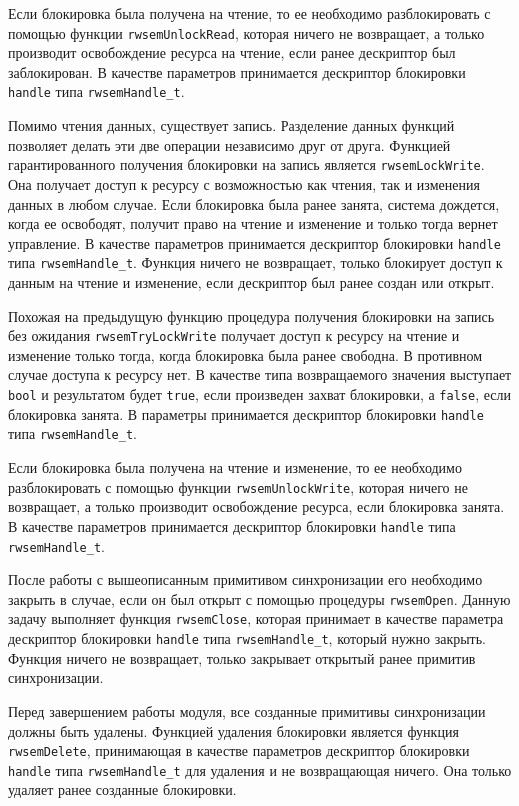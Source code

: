 Если блокировка была получена на чтение, то ее необходимо разблокировать с помощью функции \lstinline{rwsemUnlockRead}, которая ничего не возвращает, а только производит освобождение ресурса на чтение, если ранее дескриптор был заблокирован. В качестве параметров принимается дескриптор блокировки \lstinline{handle} типа \lstinline{rwsemHandle_t}.

Помимо чтения данных, существует запись. Разделение данных функций позволяет делать эти две операции независимо друг от друга. Функцией гарантированного получения блокировки на запись
является \lstinline{rwsemLockWrite}. Она получает доступ к ресурсу с возможностью как чтения, так и изменения данных в любом случае. Если блокировка была ранее занята, система дождется, когда ее освободят, получит право на чтение и изменение и только тогда вернет управление. В качестве параметров принимается дескриптор блокировки \lstinline{handle} типа \lstinline{rwsemHandle_t}. Функция ничего не возвращает, только блокирует доступ к данным на чтение и изменение, если дескриптор был ранее создан или открыт.

Похожая на предыдущую функцию процедура получения блокировки на запись без ожидания \lstinline{rwsemTryLockWrite} получает доступ к ресурсу на чтение и изменение только тогда, когда блокировка была ранее свободна. В противном случае доступа к ресурсу нет. В качестве типа возвращаемого значения выступает \lstinline{bool} и результатом будет \lstinline{true}, если произведен захват блокировки, а \lstinline{false}, если блокировка занята. В параметры принимается дескриптор блокировки \lstinline{handle} типа \lstinline{rwsemHandle_t}.

Если блокировка была получена на чтение и изменение, то ее необходимо разблокировать с помощью функции \lstinline{rwsemUnlockWrite}, которая ничего не возвращает, а только производит освобождение ресурса, если блокировка занята. В качестве параметров принимается дескриптор блокировки \lstinline{handle} типа \lstinline{rwsemHandle_t}.

После работы с вышеописанным примитивом синхронизации его необходимо закрыть в случае, если он был открыт с помощью процедуры \lstinline{rwsemOpen}. Данную задачу выполняет функция \lstinline{rwsemClose}, которая принимает в качестве параметра
дескриптор блокировки \lstinline{handle} типа \lstinline{rwsemHandle_t}, который нужно закрыть. Функция ничего не возвращает, только закрывает открытый ранее примитив синхронизации.

Перед завершением работы модуля, все созданные примитивы синхронизации должны быть  удалены. Функцией удаления блокировки является функция
\lstinline{rwsemDelete}, принимающая в качестве параметров дескриптор блокировки \lstinline{handle} типа \lstinline{rwsemHandle_t} для удаления и не возвращающая ничего. Она только удаляет ранее
созданные блокировки.

